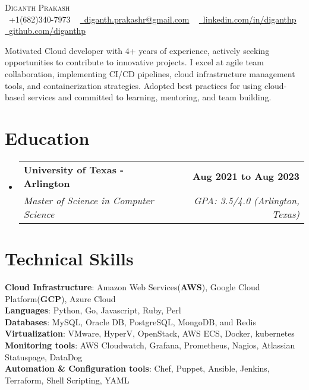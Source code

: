 \documentclass[letterpaper,11pt]{article}
\makeatletter
\newcommand{\resumeSubheading}[4]{
  \vspace{-2pt}\item
    \begin{tabular*}{1.0\textwidth}[t]{l@{\extracolsep{\fill}}r}
      \textbf{#1} & \textbf{\small #2} \\
      \textit{\small#3} & \textit{\small #4} \\
    \end{tabular*}\vspace{-7pt}
}
\newcommand{\resumeSubHeadingListStart}{\begin{itemize}[leftmargin=0.0in, label={}]}
\newcommand{\resumeSubHeadingListEnd}{\end{itemize}}
\makeatother
\begin{document}
\begin{center}
    {\LARGE \scshape Diganth Prakash} \\ \vspace{1pt}
    \small \raisebox{-0.1\height}\faPhone\ +1(682)340-7973 ~ \href{mailto:diganth.prakashr@gmail.com}{\raisebox{-0.2\height}\faEnvelope\  {diganth.prakashr@gmail.com}} ~ 
    \href{https://www.linkedin.com/in/diganthp/}{\raisebox{-0.2\height}\faEnvelope\   {linkedin.com/in/diganthp}}  ~
    \href{https://github.com/diganthp}{\raisebox{-0.2\height}\faGithub\ {github.com/diganthp}}
    \vspace{-2pt}
\end{center}


\small{Motivated Cloud developer with 4+ years of experience, actively seeking opportunities to contribute to innovative projects. I excel at agile team collaboration, implementing CI/CD pipelines, cloud infrastructure management tools, and containerization strategies. Adopted best practices for using cloud-based services and committed to learning, mentoring, and team building.}

  \vspace{-8pt}
\section{Education}
  \resumeSubHeadingListStart
    \resumeSubheading
      {University of Texas - Arlington}{Aug 2021 to Aug 2023}
      {Master of Science in Computer Science}{GPA: 3.5/4.0 (Arlington, Texas)}
  \resumeSubHeadingListEnd
  \vspace{-10pt}

\section{Technical Skills}
 \begin{itemize}[leftmargin=0.04in, label={}]
    \small{\item{
    \textbf{Cloud Infrastructure}{: Amazon Web Services(\textbf{AWS}), Google Cloud Platform(\textbf{GCP}), Azure Cloud} \\
    \textbf{Languages}{: Python, Go, Javascript, Ruby, Perl} \\
    \textbf{Databases}{: MySQL, Oracle DB, PostgreSQL, MongoDB, and Redis} \\
     \textbf{Virtualization}{:  VMware, HyperV, OpenStack, AWS ECS, Docker, kubernetes} \\
    \textbf{Monitoring tools}{: AWS Cloudwatch, Grafana, Prometheus, Nagios, Atlassian Statuspage, DataDog} \\
    \textbf{Automation \& Configuration tools}{: Chef, Puppet, Ansible, Jenkins, Terraform, Shell Scripting, YAML} \\
    }}
 \end{itemize}
 \vspace{-16pt}
\end{document}
